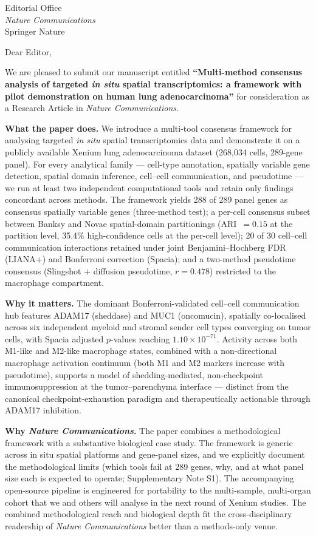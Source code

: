 \documentclass[11pt,a4paper]{letter}
\date{}
\begin{document}
\begin{letter}{Editorial Office\\\textit{Nature Communications}\\Springer Nature}
\opening{Dear Editor,}

We are pleased to submit our manuscript entitled \textbf{``Multi-method consensus analysis of targeted \textit{in situ} spatial transcriptomics: a framework with pilot demonstration on human lung adenocarcinoma''} for consideration as a Research Article in \textit{Nature Communications}.

\textbf{What the paper does.} We introduce a multi-tool consensus framework for analysing targeted \textit{in situ} spatial transcriptomics data and demonstrate it on a publicly available Xenium lung adenocarcinoma dataset (268{,}034 cells, 289-gene panel). For every analytical family --- cell-type annotation, spatially variable gene detection, spatial domain inference, cell--cell communication, and pseudotime --- we run at least two independent computational tools and retain only findings concordant across methods. The framework yields 288 of 289 panel genes as consensus spatially variable genes (three-method test); a per-cell consensus subset between Banksy and Novae spatial-domain partitionings (ARI~$=0.15$ at the partition level, 35.4\% high-confidence cells at the per-cell level); 20 of 30 cell--cell communication interactions retained under joint Benjamini--Hochberg FDR (LIANA+) and Bonferroni correction (Spacia); and a two-method pseudotime consensus (Slingshot + diffusion pseudotime, $r = 0.478$) restricted to the macrophage compartment.

\textbf{Why it matters.} The dominant Bonferroni-validated cell--cell communication hub features ADAM17 (sheddase) and MUC1 (oncomucin), spatially co-localised across six independent myeloid and stromal sender cell types converging on tumor cells, with Spacia adjusted $p$-values reaching $1.10 \times 10^{-71}$. Activity across both M1-like and M2-like macrophage states, combined with a non-directional macrophage activation continuum (both M1 and M2 markers increase with pseudotime), supports a model of shedding-mediated, non-checkpoint immunosuppression at the tumor--parenchyma interface --- distinct from the canonical checkpoint-exhaustion paradigm and therapeutically actionable through ADAM17 inhibition.

\textbf{Why \textit{Nature Communications}.} The paper combines a methodological framework with a substantive biological case study. The framework is generic across in situ spatial platforms and gene-panel sizes, and we explicitly document the methodological limits (which tools fail at 289 genes, why, and at what panel size each is expected to operate; Supplementary Note S1). The accompanying open-source pipeline is engineered for portability to the multi-sample, multi-organ cohort that we and others will analyse in the next round of Xenium studies. The combined methodological reach and biological depth fit the cross-disciplinary readership of \textit{Nature Communications} better than a methods-only venue.


\end{letter}
\end{document}
